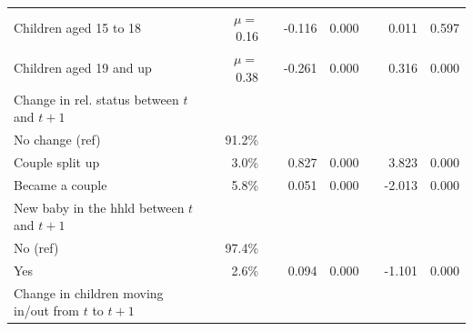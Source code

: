 \begin{table}[H]
\begin{adjustwidth}{-1in}{-1in}
\begin{tabular}{lrrrrrrr}
		\hspace{2mm} Children aged 15 to 18                    & $\mu = $ 0.16    &  & -0.116                   & 0.000                 &                      & 0.011                    & 0.597                 \\
		\hspace{2mm} Children aged 19 and up                   & $\mu = $ 0.38    &  & -0.261                   & 0.000                 &                      & 0.316                    & 0.000                 \\
		Change in rel. status between $t$ and $t + 1$ &         &  &                          &                       &                      &                          &                       \\
		\hspace{2mm} No change (ref)                           & 91.2\%  &  &                          &                       &                      &                          &                       \\
		\hspace{2mm} Couple split up                           & 3.0\%   &  & 0.827                    & 0.000                 &                      & 3.823                    & 0.000                 \\
		\hspace{2mm} Became a couple                           & 5.8\%   &  & 0.051                    & 0.000                 &                      & -2.013                   & 0.000                 \\
		New baby in the hhld between $t$ and $t + 1$            &         &  &                          &                       &                      &                          &                       \\
		\hspace{2mm} No (ref)                                  & 97.4\%  &  &                          &                       &                      &                          &                       \\
		\hspace{2mm} Yes                                       & 2.6\%   &  & 0.094                    & 0.000                 &                      & -1.101                   & 0.000                 \\
		Change in children moving in/out from $t$ to $t + 1$        &         &  &                          &                       &                      &                          &                       \\

\end{tabular}
\end{adjustwidth}
\end{table}
